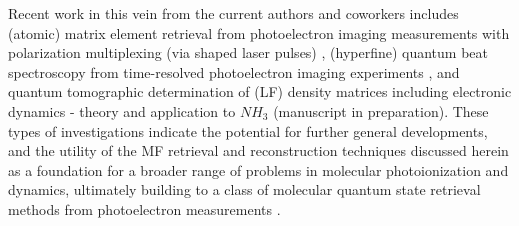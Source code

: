 Recent work in this vein from the current authors and coworkers includes (atomic) matrix element retrieval from photoelectron imaging measurements with polarization multiplexing (via shaped laser pulses) \cite{hockett2014CompletePhotoionizationExperiments, hockett2015MaximuminformationPhotoelectronMetrology,hockett2015CoherentControlPhotoelectron, hockett2015CompletePhotoionizationExperiments}, (hyperfine) quantum beat spectroscopy from time-resolved photoelectron imaging experiments \cite{forbes2018QuantumbeatPhotoelectronimagingSpectroscopy}, and quantum tomographic determination of (LF) density matrices including electronic dynamics - theory \cite{gregory2022LaboratoryFrameDensity} and application to $NH_3$ (manuscript in preparation). These types of investigations indicate the potential for further general developments, and the utility of the MF retrieval and reconstruction techniques discussed herein as a foundation for a broader range of problems in molecular photoionization and dynamics, ultimately building to a class of molecular quantum state retrieval methods from photoelectron measurements \cite{hockett2018QMP1, hockett2018QMP2}. 




